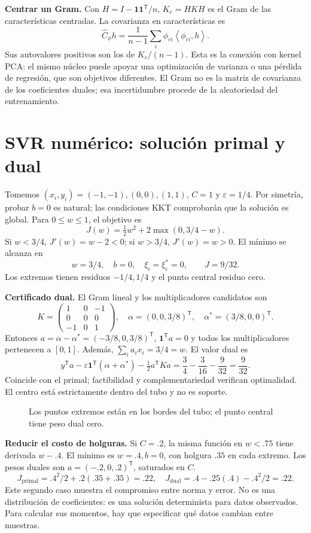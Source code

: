 \documentclass[11pt,a4paper]{article}
\newcommand{\T}{^{\mathsf T}}
\newcommand{\ones}{\mathbf 1}
\newcommand{\ip}[2]{\left\langle #1,#2\right\rangle}
\newcommand{\topic}[2]{\clearpage\section{#1}\label{#2}}
\theoremstyle{definition}\newtheorem{definicion}[teorema]{Definición}
\begin{document}
\textbf{Centrar un Gram.}
Con $H=I-\ones\ones\T/n$, $K_c=HKH$ es el Gram de las
características centradas. La covarianza en características es
\[
\widehat C_\phi h
=\frac1{n-1}\sum_i\phi_{ci}\ip{\phi_{ci}}h.
\]
Sus autovalores positivos son los de $K_c/(n-1)$.
Esta es la conexión con kernel PCA: el mismo núcleo puede apoyar
una optimización de varianza o una pérdida de regresión, que son objetivos
diferentes.
El Gram no es la matriz de covarianza de los coeficientes duales;
esa incertidumbre procede de la aleatoriedad del entrenamiento.
\topic{SVR numérico: solución primal y dual}{s52}
Tomemos $(x_i,y_i)=(-1,-1),(0,0),(1,1)$, $C=1$ y
$\varepsilon=1/4$. Por simetría, probar $b=0$ es natural; las
condiciones KKT comprobarán que la solución es global.
Para $0\le w\le1$, el objetivo es
\[
J(w)=\tfrac12w^2+2\max(0,3/4-w).
\]
Si $w<3/4$, $J'(w)=w-2<0$; si $w>3/4$, $J'(w)=w>0$.
El mínimo se alcanza en
\[
\boxed{w=3/4,\quad b=0,\quad \xi_i=\xi_i^*=0},
\qquad J=9/32.
\]
Los extremos tienen residuos $-1/4,1/4$ y el punto central residuo cero.

\textbf{Certificado dual.}
El Gram lineal y los multiplicadores candidatos son
\[
K=\begin{pmatrix}1&0&-1\\0&0&0\\-1&0&1\end{pmatrix},\quad
\alpha=(0,0,3/8)\T,\quad \alpha^*=(3/8,0,0)\T.
\]
Entonces $a=\alpha-\alpha^*=(-3/8,0,3/8)\T$,
$\ones\T a=0$ y todos los multiplicadores pertenecen a $[0,1]$.
Además, $\sum_i a_ix_i=3/4=w$.
El valor dual es
\[
y\T a-\varepsilon\ones\T(\alpha+\alpha^*)-\tfrac12a\T Ka
=\frac34-\frac3{16}-\frac9{32}=\frac9{32}.
\]
Coincide con el primal; factibilidad y complementariedad verifican
optimalidad. El centro está estrictamente dentro del tubo y no es soporte.

\begin{figure}[H]\centering
{}
\caption{Los puntos extremos están en los bordes del tubo; el punto central tiene peso dual cero.}
\end{figure}
\textbf{Reducir el costo de holguras.}
Si $C=.2$, la misma función en $w<.75$ tiene derivada $w-.4$.
El mínimo es $w=.4,b=0$, con holgura $.35$ en cada extremo.
Los pesos duales son $a=(-.2,0,.2)\T$, saturados en $C$.
\[
J_{\mathrm{primal}}=.4^2/2+.2(.35+.35)=.22,
\quad
J_{\mathrm{dual}}=.4-.25(.4)-.4^2/2=.22.
\]
Este segundo caso muestra el compromiso entre norma y error.
No es una distribución de coeficientes: es una solución determinista
para datos observados. Para calcular sus momentos, hay que especificar
qué datos cambian entre muestras.
\end{document}
